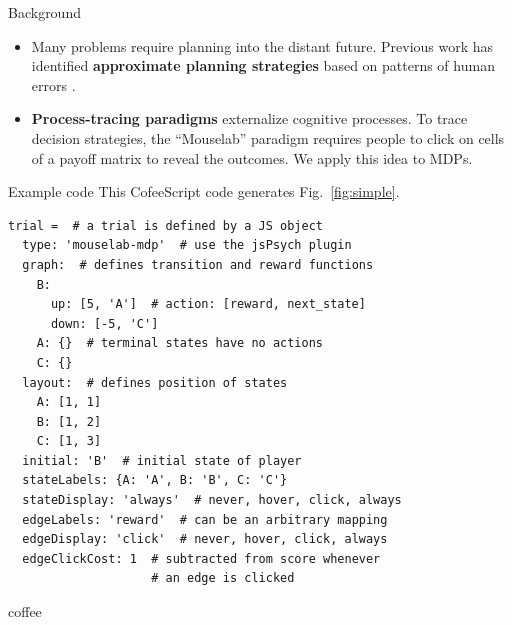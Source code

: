 \documentclass[final]{beamer}
\newlength{\onecolwid}
\begin{document}
\begin{frame}[t, fragile]
\begin{columns}[t]
\begin{column}{\onecolwid}
  \begin{block}{Background}\label{Background}
    \begin{itemize}
      \item Many problems require planning into the distant future.
            Previous work has identified %
            \textbf{approximate planning strategies} based on patterns of human errors \cite{Huys2015}.
      \item \textbf{Process-tracing paradigms} externalize cognitive processes.
            To trace decision strategies, the ``Mouselab'' paradigm \cite{Payne1988} requires people to click on cells of a payoff matrix to reveal the outcomes. We apply this idea to MDPs.
    \end{itemize}

    

  \end{block}

  \begin{block}{Example code}\label{usage}
    This CofeeScript code generates Fig.~\ref{fig:simple}.
    \begin{verbatim}
trial =  # a trial is defined by a JS object
  type: 'mouselab-mdp'  # use the jsPsych plugin
  graph:  # defines transition and reward functions
    B:
      up: [5, 'A']  # action: [reward, next_state]
      down: [-5, 'C']
    A: {}  # terminal states have no actions
    C: {}
  layout:  # defines position of states
    A: [1, 1]
    B: [1, 2]
    C: [1, 3]
  initial: 'B'  # initial state of player
  stateLabels: {A: 'A', B: 'B', C: 'C'}
  stateDisplay: 'always'  # never, hover, click, always
  edgeLabels: 'reward'  # can be an arbitrary mapping
  edgeDisplay: 'click'  # never, hover, click, always
  edgeClickCost: 1  # subtracted from score whenever
                    # an edge is clicked
    \end{verbatim}{coffee}
  \end{block}

\end{column} %


\end{columns}
\end{frame}
\end{document}
